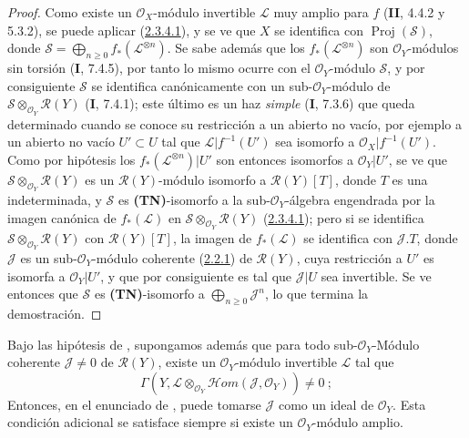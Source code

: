 \begin{proof}
Como existe un $\mathcal O_X$-módulo invertible $\mathcal L$ muy amplio para $f$ (\textbf{II}, 4.4.2 y 5.3.2), se puede aplicar (\hyperref[III.2.3.4.1-fr]{2.3.4.1}), y se ve que $X$ se identifica con $\operatorname{Proj}(\mathcal S)$, donde $\mathcal S=\bigoplus_{n\geq0}f_*(\mathcal L^{\otimes n})$. Se sabe además que los $f_*(\mathcal L^{\otimes n})$ son $\mathcal O_Y$-módulos sin torsión (\textbf{I}, 7.4.5), por tanto lo mismo ocurre con el $\mathcal O_Y$-módulo $\mathcal S$, y por consiguiente $\mathcal S$ se identifica canónicamente con un sub-$\mathcal O_Y$-módulo de $\mathcal S\otimes_{\mathcal O_Y}\mathcal R(Y)$ (\textbf{I}, 7.4.1); este último es un haz \emph{simple} (\textbf{I}, 7.3.6) que queda determinado cuando se conoce su restricción a un abierto no vacío, por ejemplo a un abierto no vacío $U'\subset U$ tal que $\mathcal L|f^{-1}(U')$ sea isomorfo a $\mathcal O_X|f^{-1}(U')$. Como por hipótesis los $f_*(\mathcal L^{\otimes n})|U'$ son entonces isomorfos a $\mathcal O_Y|U'$, se ve que $\mathcal S\otimes_{\mathcal O_Y}\mathcal R(Y)$ es un $\mathcal R(Y)$-módulo isomorfo a $\mathcal R(Y)[T]$, donde $T$ es una indeterminada, y $\mathcal S$ es \textbf{(TN)}-isomorfo a la sub-$\mathcal O_Y$-álgebra engendrada por la imagen canónica de $f_*(\mathcal L)$ en $\mathcal S\otimes_{\mathcal O_Y}\mathcal R(Y)$ (\hyperref[III.2.3.4.1-fr]{2.3.4.1}); pero si se identifica $\mathcal S\otimes_{\mathcal O_Y}\mathcal R(Y)$ con $\mathcal R(Y)[T]$, la imagen de $f_*(\mathcal L)$ se identifica con $\mathcal J.T$, donde $\mathcal J$ es un sub-$\mathcal O_Y$-módulo coherente (\hyperref[III.2.2.1-fr]{2.2.1}) de $\mathcal R(Y)$, cuya restricción a $U'$ es isomorfa a $\mathcal O_Y|U'$, y que por consiguiente es tal que $\mathcal J|U$ sea invertible. Se ve entonces que $\mathcal S$ es \textbf{(TN)}-isomorfo a $\bigoplus_{n\geq0}\mathcal J^n$, lo que termina la demostración.
\end{proof}

\begin{corollary}[2.3.6]
\label{III.2.3.6}
\label{III.2.3.6-fr}
Bajo las hipótesis de , supongamos además que para todo sub-$\mathcal O_Y$-Módulo coherente
$\mathcal J\neq0$ de $\mathcal R(Y)$, existe un
$\mathcal O_Y$-módulo invertible $\mathcal L$ tal que
\[
\Gamma(Y,\mathcal L\otimes_{\mathcal O_Y}
\mathcal{H}om(\mathcal J,\mathcal O_Y))\neq0~;
\]
Entonces, en el enunciado de , puede tomarse $\mathcal J$ como un ideal de $\mathcal O_Y$.
Esta condición adicional se satisface siempre si existe un $\mathcal O_Y$-módulo amplio.
\end{corollary}

